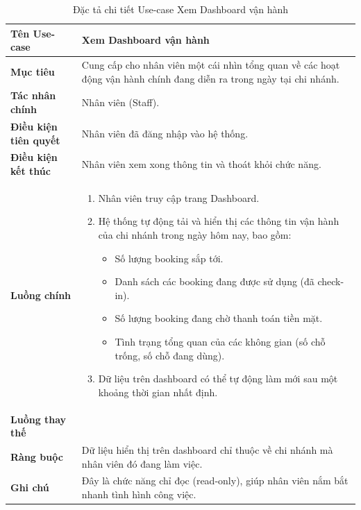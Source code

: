 
\begin{table}[H]
\centering
\renewcommand{\arraystretch}{1.3}
\begin{tabular}{|p{4cm}|p{10cm}|}
\hline
\textbf{Tên Use-case} 
& Xem Dashboard vận hành \\ 
\hline

\textbf{Mục tiêu} 
& Cung cấp cho nhân viên một cái nhìn tổng quan về các hoạt động vận hành chính đang diễn ra trong ngày tại chi nhánh. \\ 
\hline

\textbf{Tác nhân chính} 
& Nhân viên (Staff). \\ 
\hline

\textbf{Điều kiện tiên quyết} 
& Nhân viên đã đăng nhập vào hệ thống. \\ 
\hline

\textbf{Điều kiện kết thúc} 
& Nhân viên xem xong thông tin và thoát khỏi chức năng. \\ 
\hline

\textbf{Luồng chính} 
& 
\begin{enumerate}
    \item Nhân viên truy cập trang Dashboard.
    \item Hệ thống tự động tải và hiển thị các thông tin vận hành của chi nhánh trong ngày hôm nay, bao gồm:
    \begin{itemize}
        \item Số lượng booking sắp tới.
        \item Danh sách các booking đang được sử dụng (đã check-in).
        \item Số lượng booking đang chờ thanh toán tiền mặt.
        \item Tình trạng tổng quan của các không gian (số chỗ trống, số chỗ đang dùng).
    \end{itemize}
    \item Dữ liệu trên dashboard có thể tự động làm mới sau một khoảng thời gian nhất định.
\end{enumerate} \\ 
\hline

\textbf{Luồng thay thế} 
 \\ 
\hline

\textbf{Ràng buộc} 
& Dữ liệu hiển thị trên dashboard chỉ thuộc về chi nhánh mà nhân viên đó đang làm việc. \\ 
\hline

\textbf{Ghi chú} 
& Đây là chức năng chỉ đọc (read-only), giúp nhân viên nắm bắt nhanh tình hình công việc. \\ 
\hline
\end{tabular}
\caption{Đặc tả chi tiết Use-case Xem Dashboard vận hành}
\label{tab:dashboard-spec}
\end{table}
